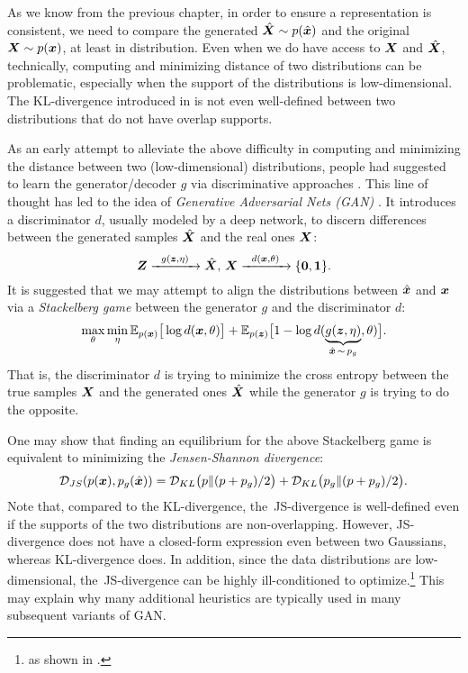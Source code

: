 \documentclass[../../book-main.tex]{subfiles}
\begin{document}
As we know from the previous chapter, in order to ensure a representation is consistent, we need to compare the generated $\hat {\bm{X}} \sim p(\hat{\bm{x}})$ and the original $\bm{X} \sim p(\bm{x})$, at least in distribution. Even when we do have access to $\bm{X}$ and $\hat {\bm{X}}$, technically, computing and minimizing distance of two distributions can be problematic, especially when the support of the distributions is low-dimensional. The KL-divergence introduced in  is not even well-defined between two distributions that do not have overlap supports. 

As an early attempt to alleviate the above difficulty in computing and minimizing the distance between two (low-dimensional)  distributions, people had suggested to learn the generator/decoder $g$ via discriminative approaches \cite{Tu-2007}. This line of thought has led to  the idea of {\em Generative Adversarial Nets (GAN)} \cite{goodfellow2014generative}. It introduces a discriminator $d$, usually modeled by a deep network, to discern differences between the generated samples $\hat {\bm{X}}$ and the real ones $\bm{X}$:
\begin{equation}
 \bm{Z} \xrightarrow{\hspace{2mm} g(\bm{z},\eta) \hspace{2mm}} \hat {\bm{X}}, \, \bm{X} \xrightarrow{\hspace{2mm} d(\bm{x}, \theta)\hspace{2mm}} \{\mathbf 0, \mathbf 1\}.
 \label{eqn:GAN}
\end{equation}
It is suggested that we may attempt to align the distributions between $\hat {\bm{x}}$ and $\bm{x}$ via a {\em Stackelberg game} between the generator $g$ and the discriminator $d$:
\begin{equation}
\max_{\theta}\min_{\eta} \mathbb{E}_{p({\bm{x}})}\big[\log d(\bm{x},\theta)\big] + \mathbb{E}_{p({\bm{z}})}\big[1 - \log d(\underbrace{g(\bm{z},\eta)}_{\hat {\bm{x}} \,\sim\, p_g},\theta)\big].
\end{equation}
That is, the discriminator $d$ is trying to minimize the cross entropy between the true samples $\bm{X}$ and the generated ones $\hat {\bm{X}}$ while the generator $g$ is trying to do  the opposite. 

One may show that finding an equilibrium for the above Stackelberg game is equivalent to minimizing the {\em Jensen-Shannon divergence}:
\begin{equation}
    \mathcal{D}_{JS}(p(\bm{x}), p_g(\hat {\bm{x}})) = \mathcal{D}_{KL}\big(p \| (p + p_g)/{2}\big) + \mathcal{D}_{KL}\big(p_g \| (p + p_g)/{2}\big).
\end{equation}
Note that, compared to the KL-divergence, the~JS-divergence is well-defined even if the supports of the two distributions are non-overlapping. However, JS-divergence does not have a closed-form expression even between two Gaussians, whereas KL-divergence does. In addition, since the data distributions are low-dimensional, the~JS-divergence can be highly ill-conditioned to optimize.\footnote{as shown in \cite{arjovsky2017wasserstein}.} This may explain why many additional heuristics are typically used in many subsequent variants of GAN. 
\end{document}
